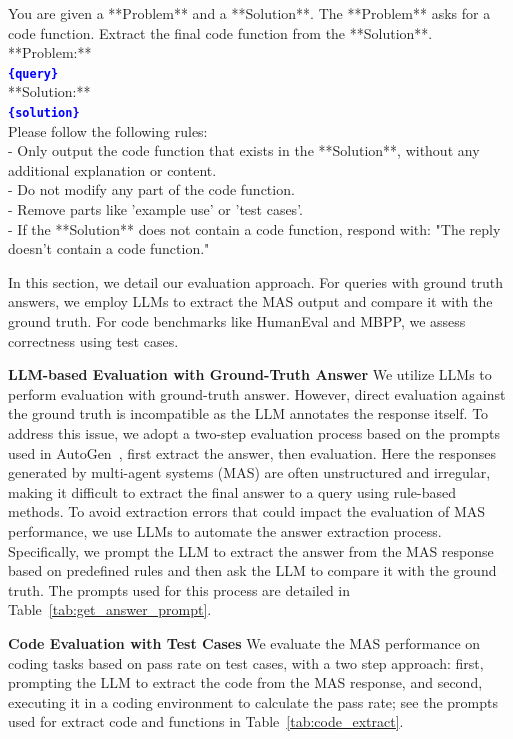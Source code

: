\documentclass{article}
\theoremstyle{plain}
\theoremstyle{definition}
\theoremstyle{remark}
\begin{document}
\begin{table}[h]
    \caption{Prompts for extract code and functions.}
    \label{tab:code_extract}
    \begin{response}
        You are given a **Problem** and a **Solution**. The **Problem** asks for a code function. Extract the final code function from the **Solution**. \\
**Problem:**\\
\textbf{\textcolor{blue}{\texttt{\{query\}}}}\\

**Solution:**\\
\textbf{\textcolor{blue}{\texttt{\{solution\}}}}\\

Please follow the following rules:\\
- Only output the code function that exists in the **Solution**, without any additional explanation or content.\\
- Do not modify any part of the code function.\\
- Remove parts like 'example use' or 'test cases'.\\
- If the **Solution** does not contain a code function, respond with: "The reply doesn't contain a code function."
    \end{response}
\end{table}

In this section, we detail our evaluation approach. For queries with ground truth answers, we employ LLMs to extract the MAS output and compare it with the ground truth. For code benchmarks like HumanEval and MBPP, we assess correctness using test cases.

\textbf{LLM-based Evaluation with Ground-Truth Answer} We utilize LLMs to perform evaluation with ground-truth answer. However, direct evaluation against the ground truth is incompatible as the LLM annotates the response itself. To address this issue, we adopt a two-step evaluation process based on the prompts used in AutoGen~\cite{wu2023autogen}, first extract the answer, then evaluation. Here the responses generated by multi-agent systems (MAS) are often unstructured and irregular, making it difficult to extract the final answer to a query using rule-based methods. To avoid extraction errors that could impact the evaluation of MAS performance, we use LLMs to automate the answer extraction process. Specifically, we prompt the LLM to extract the answer from the MAS response based on predefined rules and then ask the LLM to compare it with the ground truth. The prompts used for this process are detailed in Table~\ref{tab:get_answer_prompt}.

\textbf{Code Evaluation with Test Cases} We evaluate the MAS performance on coding tasks based on pass rate on test cases, with a two step approach: first, prompting the LLM to extract the code from the MAS response, and second, executing it in a coding environment to calculate the pass rate; see the prompts used for extract code and functions in Table~\ref{tab:code_extract}.


\end{document}
